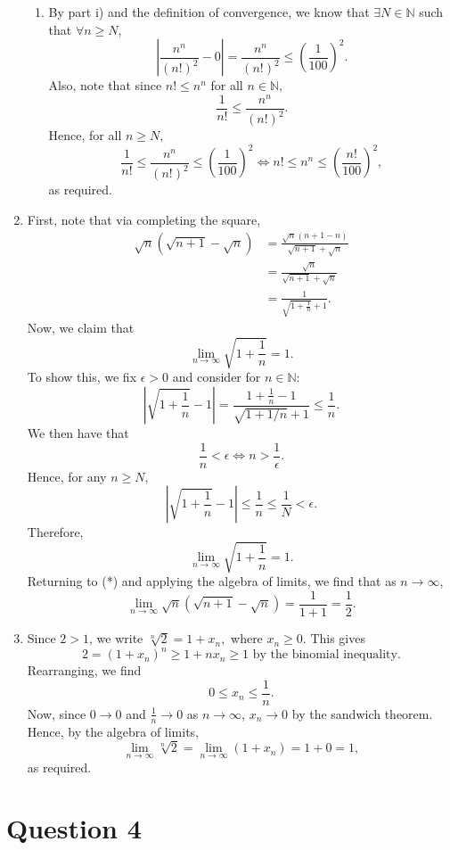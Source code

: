 \documentclass[
  12pt,
  a4paper]{extarticle}
\theoremstyle{plain}
\theoremstyle{definition}
\theoremstyle{plain}
\theoremstyle{plain}
\theoremstyle{plain}
\theoremstyle{plain}
\theoremstyle{definition}
\theoremstyle{definition}
\newtheorem*{Order Axioms*}{Order Axioms}\newtheorem{Order Axioms}{Order Axioms}[section]
\theoremstyle{remark}
\theoremstyle{remark}
\renewcommand{\;}{\,}
\begin{document}
\begin{enumerate}
\begin{enumerate}
  \item
    By part i) and the definition of convergence, we know that \(\exists N \in \mathbb{N}\) such that \(\forall n \geq N\), \[\left\lvert\frac{n^n}{(n!)^2} - 0 \right\rvert =  \frac{n^n}{(n!)^2} \leq \left(\frac{1}{100}\right)^2.\] Also, note that since \(n! \leq n^n\) for all \(n \in \mathbb{N},\) \[\frac{1}{n!} \leq \frac{n^n}{(n!)^2}.\] Hence, for all \(n \geq N,\) \[\frac{1}{n!} \leq \frac{n^n}{(n!)^2} \leq \left(\frac{1}{100}\right)^2 \Longleftrightarrow n! \leq n^n \leq \left(\frac{n!}{100}\right)^2,\] as required.
  \end{enumerate}
\item
  First, note that via completing the square, \begin{align}\sqrt{n}(\sqrt{n+1} - \sqrt{n}) &= \frac{\sqrt{n}(n+1 - n)}{\sqrt{n+1} + \sqrt{n}}\nonumber\\ &= \frac{\sqrt{n}}{\sqrt{n+1} + \sqrt{n}}\nonumber\\ &= \frac{1}{\sqrt{1 + \frac{1}{n}} + 1}.\tag{*}\end{align} Now, we claim that \[\lim_{n \to \infty} \sqrt{1 + \frac{1}{n}} = 1.\] To show this, we fix \(\epsilon > 0\) and consider for \(n \in \mathbb{N}:\) \[\left\lvert \sqrt{1 + \frac{1}{n}} - 1\right\rvert = \frac{1 + \frac{1}{n}-1}{\sqrt{1 + 1/n}+1} \leq \frac{1}{n}.\] We then have that \[\frac{1}{n} < \epsilon \Longleftrightarrow n > \frac{1}{\epsilon}.\] Hence, for any \(n \geq N,\) \[\left\lvert \sqrt{1 + \frac{1}{n}} - 1\right\rvert \leq \frac{1}{n} \leq \frac{1}{N} < \epsilon.\] Therefore, \[\lim_{n \to \infty} \sqrt{1 + \frac{1}{n}} = 1.\] Returning to (*) and applying the algebra of limits, we find that as \(n \to \infty\), \[\lim_{n \to \infty}\sqrt{n}(\sqrt{n+1} - \sqrt{n}) = \frac{1}{1+1} = \frac{1}{2}.\]
\item
  Since \(2 > 1\), we write \(\sqrt[n]{2} = 1 + x_n,\) where \(x_n \geq 0\). This gives \[2 = (1 + x_n)^n \geq 1 + nx_n \geq 1\;\; \text{by the binomial inequality}.\] Rearranging, we find \[0 \leq x_n \leq \frac{1}{n}.\] Now, since \(0 \to 0\) and \(\frac{1}{n} \to 0\) as \(n \to \infty\), \(x_n \to 0\) by the sandwich theorem. Hence, by the algebra of limits, \[\lim_{n \to \infty} \sqrt[n]{2} = \lim_{n\to\infty}(1 + x_n) = 1 + 0 = 1,\] as required.
\end{enumerate}

\hypertarget{question-4}{%
\section{Question 4}\label{question-4}}
\end{document}

